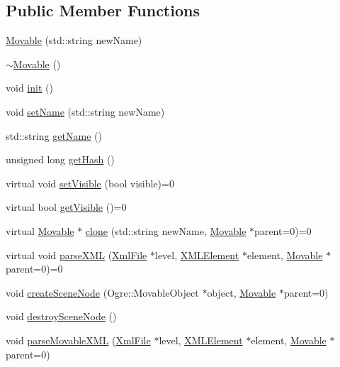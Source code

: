 \subsection*{Public Member Functions}
\begin{DoxyCompactItemize}
\item 
\hyperlink{class_rad_xml_1_1_movable_a77fb6a99effa2d728b743035803bf5e7}{Movable} (std\-::string new\-Name)
\item 
\hyperlink{class_rad_xml_1_1_movable_a186ba3cb69a83f984d5780d418d36368}{$\sim$\-Movable} ()
\item 
void \hyperlink{class_rad_xml_1_1_movable_a0ec1273070085006bd8eae6702c9c6d1}{init} ()
\item 
void \hyperlink{class_rad_xml_1_1_movable_a38de43c5c67c417eb528c2b842eb1505}{set\-Name} (std\-::string new\-Name)
\item 
std\-::string \hyperlink{class_rad_xml_1_1_movable_a2eba187824e9c5b07f9a94221ffacdf5}{get\-Name} ()
\item 
unsigned long \hyperlink{class_rad_xml_1_1_movable_a18bbb0515dc8144b58b19319bc877373}{get\-Hash} ()
\item 
virtual void \hyperlink{class_rad_xml_1_1_movable_af8911805b88cf189231d8beed68e4018}{set\-Visible} (bool visible)=0
\item 
virtual bool \hyperlink{class_rad_xml_1_1_movable_a9dfae163267b8152017c9531fb74343f}{get\-Visible} ()=0
\item 
virtual \hyperlink{class_rad_xml_1_1_movable}{Movable} $\ast$ \hyperlink{class_rad_xml_1_1_movable_ac6a4bed9cfb97803f982201be0f70caa}{clone} (std\-::string new\-Name, \hyperlink{class_rad_xml_1_1_movable}{Movable} $\ast$parent=0)=0
\item 
virtual void \hyperlink{class_rad_xml_1_1_movable_a3bfa50630cbc5b287f5b54262744ac63}{parse\-X\-M\-L} (\hyperlink{class_rad_xml_1_1_xml_file}{Xml\-File} $\ast$level, \hyperlink{class_x_m_l_element}{X\-M\-L\-Element} $\ast$element, \hyperlink{class_rad_xml_1_1_movable}{Movable} $\ast$parent=0)=0
\item 
void \hyperlink{class_rad_xml_1_1_movable_a4ead93cfd127298003b6d235a9d8e264}{create\-Scene\-Node} (Ogre\-::\-Movable\-Object $\ast$object, \hyperlink{class_rad_xml_1_1_movable}{Movable} $\ast$parent=0)
\item 
void \hyperlink{class_rad_xml_1_1_movable_a7e4741fde083b750fad8898319a442ea}{destroy\-Scene\-Node} ()
\item 
void \hyperlink{class_rad_xml_1_1_movable_a17a0acd7863ffdd29b43dd54562780f7}{parse\-Movable\-X\-M\-L} (\hyperlink{class_rad_xml_1_1_xml_file}{Xml\-File} $\ast$level, \hyperlink{class_x_m_l_element}{X\-M\-L\-Element} $\ast$element, \hyperlink{class_rad_xml_1_1_movable}{Movable} $\ast$parent=0)

\end{DoxyCompactItemize}
